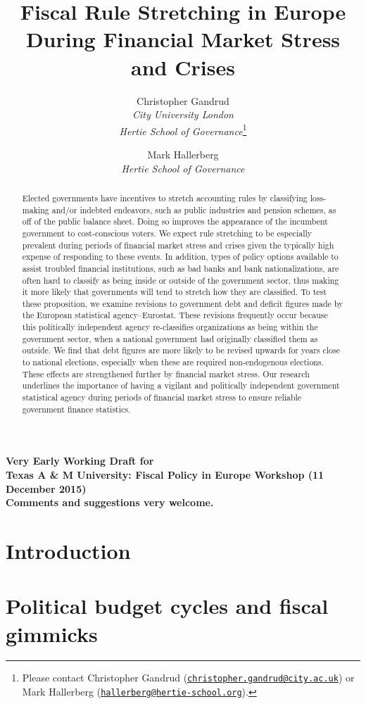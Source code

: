 \documentclass[]{article}
\title{Fiscal Rule Stretching in Europe During Financial Market Stress and Crises}
\author{Christopher Gandrud \\ \emph{City University London} \\ \emph{Hertie School of Governance}\footnote{Please contact Christopher Gandrud
(\href{mailto:christopher.gandrud@city.ac.uk}{\nolinkurl{christopher.gandrud@city.ac.uk}}) or Mark Hallerberg (\href{mailto:hallerberg@hertie-school.org}{\nolinkurl{hallerberg@hertie-school.org}}).}
\and
Mark Hallerberg \\ \emph{Hertie School of Governance}}
\begin{document}
\maketitle

\begin{center}
    \textbf{Very Early Working Draft for\\ Texas A \& M University: Fiscal Policy in Europe Workshop (11 December 2015) \\
    Comments and suggestions very welcome.}
\end{center}

\begin{abstract}
    Elected governments have incentives to stretch accounting rules by classifying loss-making and/or indebted endeavors, such as public industries and pension schemes, as off of the public balance sheet. Doing so improves the appearance of the incumbent government to cost-conscious voters. We expect rule stretching to be especially prevalent during periods of financial market stress and crises given the typically high expense of responding to these events. In addition, types of policy options available to assist troubled financial institutions, such as bad banks and bank nationalizations, are often hard to classify as being inside or outside of the government sector, thus making it more likely that governments will tend to stretch how they are classified. To test these proposition, we examine revisions to government debt and deficit figures made by the European statistical agency--Eurostat. These revisions frequently occur because this politically independent agency re-classifies organizations as being within the government sector, when a national government had originally classified them as outside. We find that debt figures are more likely to be revised upwards for years close to national elections, especially when these are required non-endogenous elections. These effects are strengthened further by financial market stress. Our research underlines the importance of having a vigilant and politically independent government statistical agency during periods of financial market stress to ensure reliable government finance statistics.
\end{abstract}

\section{Introduction}

\section{Political budget cycles and fiscal gimmicks}
\end{document}
